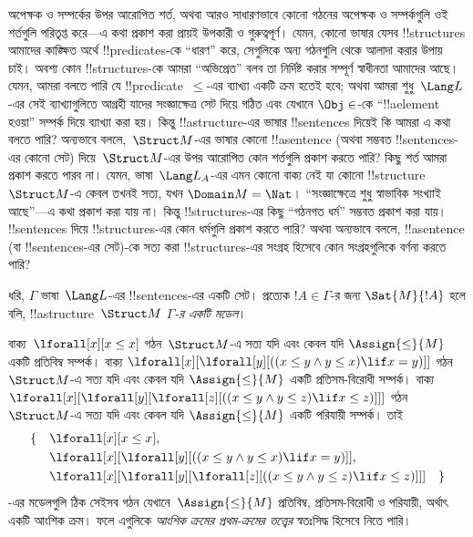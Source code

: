 \documentclass[../../../include/open-logic-section]{subfiles}
\begin{document}


\begin{explain}
অপেক্ষক ও সম্পর্কের উপর আরোপিত শর্ত, অথবা আরও সাধারণভাবে কোনো গঠনের
অপেক্ষক ও সম্পর্কগুলি ওই শর্তগুলি পরিতৃপ্ত করে—এ কথা প্রকাশ করা প্রায়ই
উপকারী ও গুরুত্বপূর্ণ। যেমন, কোনো ভাষার যেসব !!{structure}s আমাদের
কাঙ্ক্ষিত অর্থে !!{predicate}s-কে “ধারণ” করে, সেগুলিকে অন্য
গঠনগুলি থেকে আলাদা করার উপায় চাই। অবশ্য কোন !!{structure}s-কে
আমরা “অভিপ্রেত” বলব তা নির্দিষ্ট করার সম্পূর্ণ স্বাধীনতা আমাদের আছে।
যেমন, আমরা বলতে পারি যে !!{predicate}~$\le$-এর ব্যাখ্যা একটি ক্রম হতেই
হবে; অথবা আমরা শুধু~$\Lang L$-এর সেই ব্যাখ্যাগুলিতে আগ্রহী যাদের
সংজ্ঞাক্ষেত্র সেট দিয়ে গঠিত এবং যেখানে $\Obj \in$-কে
“!!a{element} হওয়া” সম্পর্ক দিয়ে ব্যাখ্যা করা হয়। কিন্তু
!!a{structure}-এর ভাষার !!{sentence}s দিয়েই কি আমরা এ কথা বলতে পারি?
অন্যভাবে বললে,~$\Struct M$-এর ভাষার কোনো !!a{sentence} (অথবা সম্ভবত
!!{sentence}s-এর কোনো সেট) দিয়ে~$\Struct M$-এর উপর আরোপিত কোন
শর্তগুলি প্রকাশ করতে পারি? কিছু শর্ত আমরা প্রকাশ করতে পারব না। যেমন,
ভাষা~$\Lang L_A$-এর এমন কোনো বাক্য নেই যা কোনো
!!{structure}~$\Struct M$-এ কেবল তখনই সত্য, যখন $\Domain M = \Nat$।
“সংজ্ঞাক্ষেত্রে শুধু স্বাভাবিক সংখ্যাই আছে”—এ কথা প্রকাশ করা যায় না।
কিন্তু !!{structure}s-এর কিছু “গঠনগত ধর্ম” সম্ভবত প্রকাশ করা যায়।
!!{sentence}s দিয়ে !!{structure}s-এর কোন ধর্মগুলি প্রকাশ করতে পারি?
অথবা অন্যভাবে বললে, !!a{sentence} (বা !!{sentence}s-এর সেট)-কে সত্য
করা !!{structure}s-এর সংগ্রহ হিসেবে কোন সংগ্রহগুলিকে বর্ণনা করতে পারি?
\end{explain}

\begin{defn}[কোনো সেটের মডেল]
ধরি, $\Gamma$ ভাষা~$\Lang L$-এর !!{sentence}s-এর একটি সেট।
প্রত্যেক $!A \in \Gamma$-র জন্য $\Sat{M}{!A}$ হলে বলি,
!!a{structure}~$\Struct M$ \emph{$\Gamma$-র একটি মডেল}।
\end{defn}

\begin{ex}
বাক্য~$\lforall[x][x \le x]$ গঠন~$\Struct M$-এ সত্য যদি এবং কেবল যদি
$\Assign{\le}{M}$ একটি প্রতিবিম্ব সম্পর্ক। বাক্য
$\lforall[x][\lforall[y][((x \le y \land y \le x) \lif x = y)]]$
গঠন~$\Struct M$-এ সত্য যদি এবং কেবল যদি $\Assign{\le}{M}$ একটি
প্রতিসম-বিরোধী সম্পর্ক। বাক্য
$\lforall[x][\lforall[y][\lforall[z][((x \le y \land y \le z)
      \lif x \le z)]]]$ গঠন~$\Struct M$-এ সত্য যদি এবং কেবল যদি
$\Assign{\le}{M}$ একটি পরিযায়ী সম্পর্ক। তাই
\begin{align*}
\{\quad &\lforall[x][x \le x], \\
   & \lforall[x][\lforall[y][((x \le y \land y \le
    x) \lif x = y)]], \\
   &\lforall[x][\lforall[y][\lforall[z][((x \le y
      \land y \le z) \lif x \le z)]]] \quad \}
\end{align*}
-এর মডেলগুলি ঠিক সেইসব গঠন যেখানে~$\Assign{\le}{M}$ প্রতিবিম্ব,
প্রতিসম-বিরোধী ও পরিযায়ী, অর্থাৎ একটি আংশিক ক্রম। ফলে এগুলিকে
\emph{আংশিক ক্রমের প্রথম-ক্রমের তত্ত্বের} স্বতঃসিদ্ধ হিসেবে নিতে পারি।
\end{ex}
\end{document}
